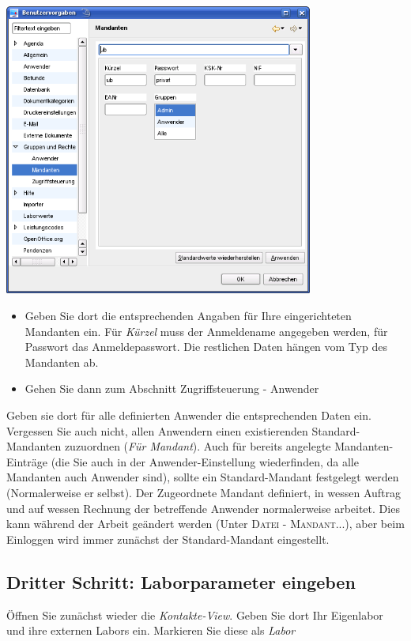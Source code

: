 \includegraphics[width=4in]{images/grundkonfmand.png}
\begin{itemize}
 \item Geben Sie dort die entsprechenden Angaben für Ihre eingerichteten Mandanten ein. Für \textit{Kürzel} muss der Anmeldename angegeben werden, für Passwort das Anmeldepasswort. Die restlichen Daten hängen vom Typ des Mandanten ab.
 \item Gehen Sie dann zum Abschnitt Zugriffsteuerung - Anwender
\end{itemize}

Geben sie dort für alle definierten Anwender die entsprechenden Daten ein. Vergessen Sie auch nicht, allen Anwendern einen existierenden Standard-Mandanten zuzuordnen (\textit{Für Mandant}). Auch für bereits angelegte Mandanten-Einträge (die Sie auch in der Anwender-Einstellung wiederfinden, da alle Mandanten auch Anwender sind), sollte ein Standard-Mandant festgelegt werden (Normalerweise er selbst). Der Zugeordnete Mandant definiert, in wessen Auftrag und auf wessen Rechnung der betreffende Anwender normalerweise arbeitet. Dies kann während der Arbeit geändert werden (Unter \textsc{Datei - Mandant}...), aber beim Einloggen wird immer zunächst der Standard-Mandant eingestellt.

\subsection{Dritter Schritt: Laborparameter eingeben}
Öffnen Sie zunächst wieder die \textit{Kontakte-View}. Geben Sie dort Ihr Eigenlabor und ihre externen Labors ein. 
Markieren Sie diese als \textit{Labor}

